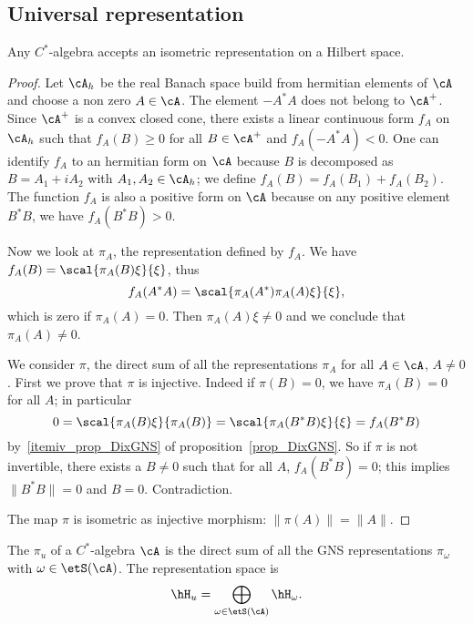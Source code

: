 \subsection{Universal representation}

\begin{theorem}
	Any $C^*$-algebra accepts an isometric representation on a Hilbert space.
\end{theorem}

\begin{proof}
	Let $\cA_h$ be the real Banach space build from hermitian elements of $\cA$ and choose a non zero $A\in\cA$. The element $-A^*A$ does not belong to $\cA^+$. Since $\cA^+$ is a convex closed cone, there exists a linear continuous form $f_A$ on $\cA_h$ such that $f_A(B)\geq 0$ for all $B\in\cA^+$ and $f_A(-A^*A)<0$. One can identify $f_A$ to an hermitian form on $\cA$ because $B$ is decomposed as $B=A_1+iA_2$ with $A_1,A_2\in\cA_h$; we define $f_A(B)=f_A(B_1)+f_A(B_2)$. The function $f_A$ is also a positive form on $\cA$ because on any positive element $B^*B$, we have $f_A(B^*B)>0$.

	Now we look at $\pi_A$, the representation defined by $f_A$. We have $f_A(B)=\scal{ \pi_A(B)\xi }{ \xi }$, thus
	\[
		f_A(A^*A)=\scal{ \pi_A(A^*)\pi_A(A)\xi }{ \xi },
	\]
	which is zero if $\pi_A(A)=0$. Then $\pi_A(A)\xi\neq 0$ and we conclude that $\pi_A(A)\neq 0$.

	We consider $\pi$, the direct sum of all the representations $\pi_A$ for all $A\in\cA$, $A\neq 0$. First we prove that $\pi$ is injective. Indeed if $\pi(B)=0$, we have $\pi_A(B)=0$ for all $A$; in particular
	\begin{equation}
		0=\scal{ \pi_A(B)\xi }{ \pi_A(B) }
		=\scal{ \pi_A(B^*B)\xi }{ \xi }
		=f_A(B^*B)
	\end{equation}
	by~\ref{itemiv_prop_DixGNS} of proposition~\ref{prop_DixGNS}. So if $\pi$ is not invertible, there exists a $B\neq 0$ such that for all $A$, $f_A(B^*B)=0$; this implies $\| B^*B \|=0$ and $B=0$. Contradiction.

	The map $\pi$ is isometric as injective morphism: $\| \pi(A) \|=\| A \|$.
\end{proof}


The  $\pi_u$ of a $C^*$-algebra $\cA$ is the direct sum of all the GNS representations $\pi_{\omega}$ with $\omega\in\etS(\cA)$. The representation space is
\[
	\hH_u=\bigoplus_{\omega\in\etS(\cA)}\hH_{\omega}.
\]



